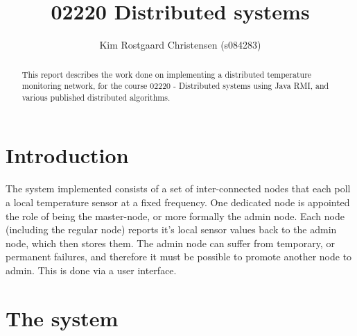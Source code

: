 \documentclass[10pt,a4paper]{article}
\begin{document}
\def\File#1{\textsf{#1}}
\def\Code#1{\texttt{#1}}
\def\Key#1{\textsf{#1}}

\title{02220 Distributed systems}
\author{Kim Rostgaard Christensen (s084283)}

\maketitle

\tableofcontents

\begin{abstract}
This report describes the work done on implementing a distributed temperature monitoring network, for the course 02220 - Distributed systems using Java RMI, and various published distributed algorithms.
\end{abstract}

\section{Introduction}
The system implemented consists of a set of inter-connected nodes that each poll a local temperature sensor at a fixed frequency. One dedicated node is appointed the role of being the master-node, or more formally the admin node. Each node (including the regular node) reports it's local sensor values back to the admin node, which then stores them.
The admin node can suffer from temporary, or permanent failures, and therefore it must be possible to promote another node to admin. This is done via a user interface.


\section{The system}
\end{document}
